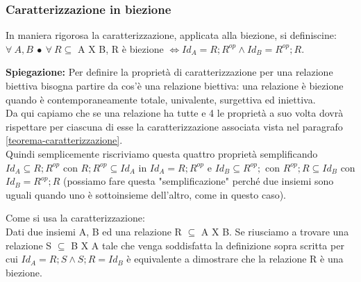 \subsubsection{Caratterizzazione in biezione}\label{caratterizzazione-biezione}
\begin{definition}[Caratterizzazione]
In maniera rigorosa la caratterizzazione, applicata alla biezione, si definiscine:
$\forall \: A, B \: \bullet \: \forall \: R \subseteq$ A X B, R è biezione $\Longleftrightarrow Id_A = R;R^{op} \land Id_B = R^{op};R$.
\end{definition}
\textbf{Spiegazione:} Per definire la proprietà di caratterizzazione per una relazione biettiva bisogna partire da cos'è una relazione biettiva: una relazione è biezione quando è contemporaneamente totale, univalente, surgettiva ed iniettiva. \\Da qui capiamo che se una relazione ha tutte e 4 le proprietà a suo volta dovrà rispettare per ciascuna di esse la caratterizzazione associata vista nel paragrafo \ref{teorema-caratterizzazione}. \\Quindi semplicemente riscriviamo questa quattro proprietà semplificando $Id_A \subseteq R;R^{op}$ con $R;R^{op} \subseteq Id_A$ in $Id_A = R;R^{op}$ e $Id_B \subseteq R^{op};$ con $R^{op};R \subseteq Id_B$ con $Id_B = R^{op};R$ (possiamo fare questa "semplificazione" perché due insiemi sono uguali quando uno è sottoinsieme dell'altro, come in questo caso).
\begin{example}
    Come si usa la caratterizzazione:\\
    Dati due insiemi A, B ed una relazione R $\subseteq$ A X B. Se riusciamo a trovare una relazione S $\subseteq$ B X A tale che venga soddisfatta la definizione sopra scritta per cui $Id_A = R;S \land S;R = Id_B$ è equivalente a dimostrare che la relazione R è una biezione.
\end{example}

\newpage
